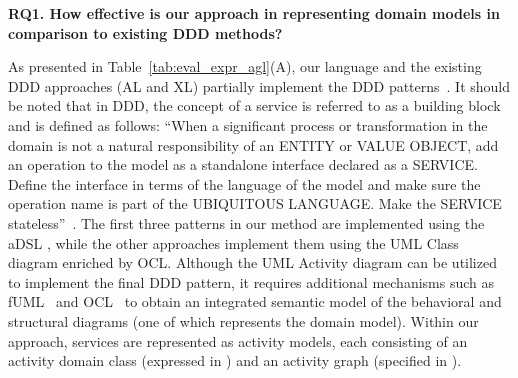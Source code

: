 \noindent \textbf{
RQ1. How effective is our approach in representing domain models in comparison to existing DDD methods?
}	

As presented in Table~\ref{tab:eval_expr_agl}(A), our language and the existing DDD approaches (AL and XL) partially implement the DDD patterns~\cite{evans_domain-driven_2004}. It should be noted that in DDD, the concept of a service is referred to as a building block and is defined as follows: ``When a significant process or transformation in the domain is not a natural responsibility of an ENTITY or VALUE OBJECT, add an operation to the model as a standalone interface declared as a SERVICE. Define the interface in terms of the language of the model and make sure the operation name is part of the UBIQUITOUS LANGUAGE. Make the SERVICE stateless''~\cite{evans_domain-driven_2004}. The first three patterns in our method are implemented using the aDSL \dcsl, while the other approaches implement them using the UML Class diagram enriched by OCL. Although the UML Activity diagram can be utilized to implement the final DDD pattern, it requires additional mechanisms such as fUML~\cite{omg_semantics_2021} and OCL~\cite{omg_object_2014} to obtain an integrated semantic model of the behavioral and structural diagrams (one of which represents the domain model). Within our approach, services are represented as activity models, each consisting of an activity domain class (expressed in \dcsl) and an activity graph (specified in \agl).

